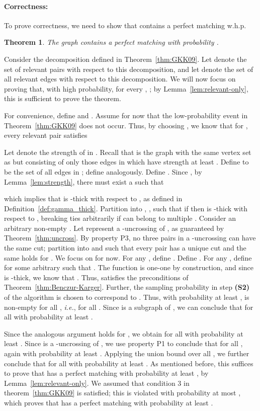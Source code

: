 \documentclass[11pt]{article}
\newtheorem{theorem}{Theorem}[section]
\newenvironment{proof}{{\bf Proof:}}{\par}
\begin{document}
\paragraph{Correctness:} To prove correctness, we need to show that 
contains a perfect matching w.h.p.
\begin{theorem}\label{thm:correctness}
  The graph  contains a perfect matching with probability .
\end{theorem}
\begin{proof}
  Consider the decomposition defined in Theorem~\ref{thm:GKK09}.  Let 
  denote the set of relevant pairs with respect to this decomposition, and let
   denote the set of all relevant edges with respect to this
  decomposition.  We will now focus on proving that, with high probability,
  for every , ; by
  Lemma~\ref{lem:relevant-only}, this is sufficient to prove the theorem.

  For convenience, define  and . Assume for now that the low-probability event in
  Theorem~\ref{thm:GKK09} does not occur. Thus, by choosing , we know that for , every relevant pair 
  satisfies
  
  
  Let  denote the strength of  in . Recall that
   is the graph with the same vertex set as  but
  consisting of only those edges in  which have strength at least
  . Define  to be the set of all edges in ;
  define  analogously. Define . Since , by
  Lemma~\ref{lem:strength}, there must exist a  such that
  
  which implies that  is -thick with
  respect to , as defined in Definition~\ref{def:gamma_thick}.
  Partition  into ,
  , such that if  then
   is -thick with respect to , breaking
  ties arbitrarily if  can belong to multiple . Consider
  an arbitrary non-empty . Let  represent a
  -uncrossing of , as guaranteed by
  Theorem~\ref{thm:uncross}. By property P3, no three pairs in a
  -uncrossing can have the same cut; partition  into
   and  such that every pair 
  has a unique cut  and the same holds for . We
  focus on  for now. For any , define . Define . For any , define  for
  some arbitrary  such that . The function 
  is one-one by construction, and since  is -thick, we know
  that . Thus,
   satisfies the preconditions of
  Theorem~\ref{thm:Benczur-Karger}. Further, the sampling probability  in
  step {\bf(S2)} of the algorithm is chosen to correspond to
  . Thus, with probability at least ,  is
  non-empty for all , {\em i.e.},  for all . Since  is a
  subgraph of , we can conclude that  for all  with probability at least
  .

  Since the analogous argument holds for , we obtain  for all  with probability
  at least . Since  is a -uncrossing of
  , we use property P1 to conclude that  for all , again with
  probability at least . Applying the union bound over all , we
  further conclude that  for all
   with probability at least . As mentioned before,
  this suffices to prove that  has a perfect matching with probability
  at least , by Lemma~\ref{lem:relevant-only}.  We assumed that
  condition 3 in theorem~\ref{thm:GKK09} is satisfied; this is violated with
  probability at most , which proves that  has a perfect
  matching with probability at least .
\end{proof}
\end{document}
